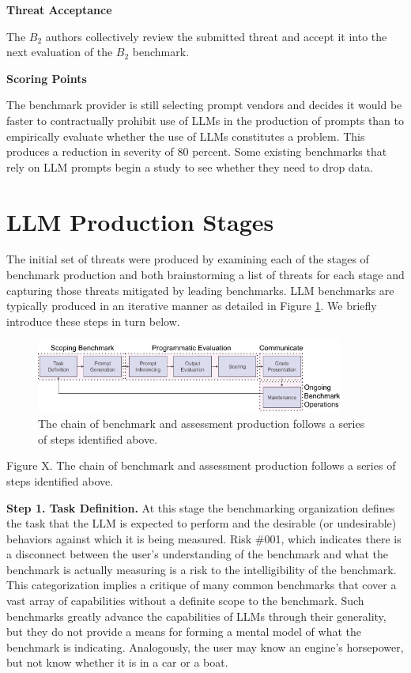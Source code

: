 \documentclass{article}
\newcommand\bb{$B_2$ }
\begin{document}
\textbf{Threat Acceptance}

The \bb authors collectively review the submitted threat and accept it into the next evaluation of the \bb benchmark.

\textbf{Scoring Points}

The benchmark provider is still selecting prompt vendors and decides it would be faster to contractually prohibit use of LLMs in the production of prompts than to empirically evaluate whether the use of LLMs constitutes a problem. This produces a reduction in severity of 80 percent. Some existing benchmarks that rely on LLM prompts begin a study to see whether they need to drop data.
\section{LLM Production Stages}
The initial set of threats were produced by examining each of the stages of benchmark production and both brainstorming a list of threats for each stage and capturing those threats mitigated by leading benchmarks.  LLM benchmarks are typically produced in an iterative manner as detailed in Figure \ref{fig:benchmark-production}. We briefly introduce these steps in turn below.

\begin{figure}[h!]
  \centering
  \includegraphics[width=0.9\textwidth]{image1.png}
  \caption{The chain of benchmark and assessment production follows a series of steps identified above.}
  \label{fig:benchmark-production}
\end{figure}

Figure X. The chain of benchmark and assessment production follows a series of steps identified above. 

{\bf Step 1. Task Definition.} At this stage the benchmarking organization defines the task that the LLM is expected to perform and the desirable (or undesirable) behaviors against which it is being measured. Risk \#001, which indicates there is a disconnect between the user's understanding of the benchmark and what the benchmark is actually measuring is a risk to the intelligibility of the benchmark. This categorization implies a critique of many common benchmarks that cover a vast array of capabilities without a definite scope to the benchmark. Such benchmarks greatly advance the capabilities of LLMs through their generality, but they do not provide a means for forming a mental model of what the benchmark is indicating. Analogously, the user may know an engine's horsepower, but not know whether it is in a car or a boat.
\end{document}
